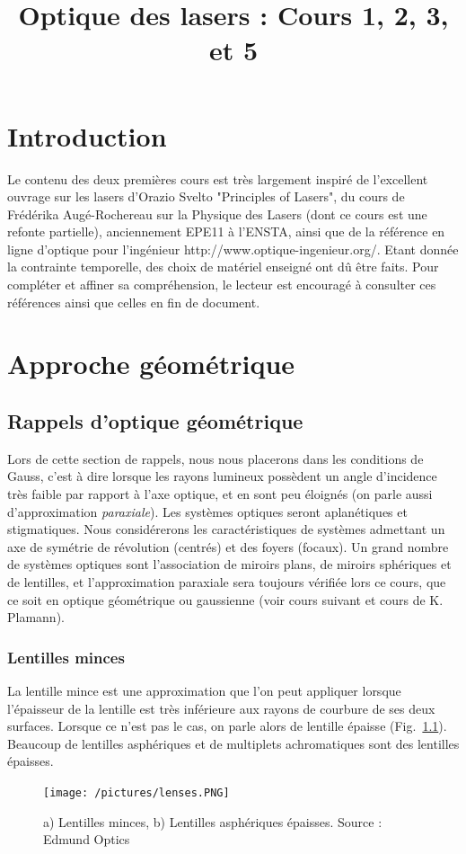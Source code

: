 \documentclass[a4paper]{book}
\title{Optique des lasers : Cours 1, 2, 3, et 5}
\author{}
\date{}
\begin{document}
\maketitle

\chapter*{Introduction}

Le contenu des deux premières  cours est très largement inspiré de l'excellent ouvrage sur les lasers d'Orazio Svelto "Principles of Lasers", du cours de Frédérika Augé-Rochereau sur la Physique des Lasers (dont ce cours est une refonte partielle), anciennement EPE11 à l'ENSTA, ainsi que de la référence en ligne d'optique pour l'ingénieur http://www.optique-ingenieur.org/. Etant donnée la contrainte temporelle, des choix de matériel enseigné ont dû être faits. Pour compléter et affiner sa compréhension, le lecteur est encouragé à consulter ces références ainsi que celles en fin de document.


\chapter{Approche géométrique}

\section{Rappels d'optique géométrique}
Lors de cette section de rappels, nous nous placerons dans les conditions de Gauss, c'est à dire lorsque les rayons lumineux possèdent un angle d'incidence très faible par rapport à l'axe optique, et en sont peu éloignés (on parle aussi d'approximation \textit{paraxiale}). Les systèmes optiques seront aplanétiques et stigmatiques. Nous considérerons les caractéristiques de systèmes admettant un axe de symétrie de révolution (centrés) et des foyers (focaux). Un grand nombre de systèmes optiques sont l’association de miroirs plans, de miroirs sphériques et de lentilles, et l'approximation paraxiale sera toujours vérifiée lors ce cours, que ce soit en optique géométrique ou gaussienne (voir cours suivant et cours de K. Plamann). 

\subsection{Lentilles minces}

La lentille mince est une approximation que l'on peut appliquer lorsque l'épaisseur de la lentille est très inférieure aux rayons de courbure de ses deux surfaces. Lorsque ce n'est pas le cas, on parle alors de lentille épaisse (Fig.~\ref{fig:lentille_mince}). Beaucoup de lentilles asphériques et de multiplets achromatiques sont des lentilles épaisses.
\begin{figure}[!htbp]
\begin{center}
\texttt{[image: /pictures/lenses.PNG]}
\end{center}
\caption{a) Lentilles minces, b) Lentilles asphériques épaisses. Source : \textcopyright Edmund Optics }
\label{fig:lentille_mince}
\end{figure}
\end{document}
